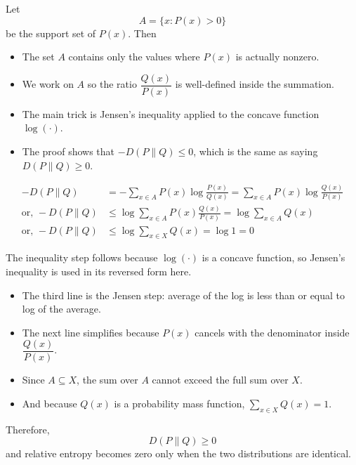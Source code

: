 \documentclass[11pt,a4paper]{book}
\newenvironment{infobox}[1][Information]{%
    \begin{tcolorbox}[
        enhanced,
        breakable,
        colback=mintgreen!10,
        colframe=mintgreen!200,
        title=#1,
        fonttitle=\bfseries,
        sharp corners,
        boxrule=0.8pt,
        left=8pt,
        right=8pt,
        top=6pt,
        bottom=6pt
    ]
}{\end{tcolorbox}}
\begin{document}
Let
\[
A = \{x : P(x) > 0\}
\]
be the support set of $P(x)$. Then
\begin{infobox}[How to Read the Proof]
\begin{itemize}
    \item The set $A$ contains only the values where $P(x)$ is actually nonzero.
    \item We work on $A$ so the ratio $\dfrac{Q(x)}{P(x)}$ is well-defined inside the summation.
    \item The main trick is Jensen's inequality applied to the concave function $\log(\cdot)$.
    \item The proof shows that $-D(P\parallel Q)\le 0$, which is the same as saying $D(P\parallel Q)\ge 0$.
\end{itemize}
\end{infobox}

\begin{align*}
-D(P \parallel Q)
&= -\sum_{x\in A} P(x)\log \frac{P(x)}{Q(x)} = \sum_{x\in A} P(x)\log \frac{Q(x)}{P(x)} \\
\text{or, } -D(P \parallel Q) &\le \log \sum_{x\in A} P(x)\frac{Q(x)}{P(x)} = \log \sum_{x\in A} Q(x) \\
\text{or, } -D(P \parallel Q) &\le \log \sum_{x\in X} Q(x) = \log 1 = 0
\end{align*}

The inequality step follows because $\log(\cdot)$ is a concave function, so Jensen's inequality is used in its reversed form here.

\begin{infobox}[What Happened in the Middle Steps]
\begin{itemize}
    \item The third line is the Jensen step: average of the log is less than or equal to log of the average.
    \item The next line simplifies because $P(x)$ cancels with the denominator inside $\dfrac{Q(x)}{P(x)}$.
    \item Since $A \subseteq X$, the sum over $A$ cannot exceed the full sum over $X$.
    \item And because $Q(x)$ is a probability mass function, \(\sum_{x\in X}Q(x)=1\).
\end{itemize}
\end{infobox}

Therefore,
\[
D(P \parallel Q) \ge 0
\]
and relative entropy becomes zero only when the two distributions are identical.
\end{document}
